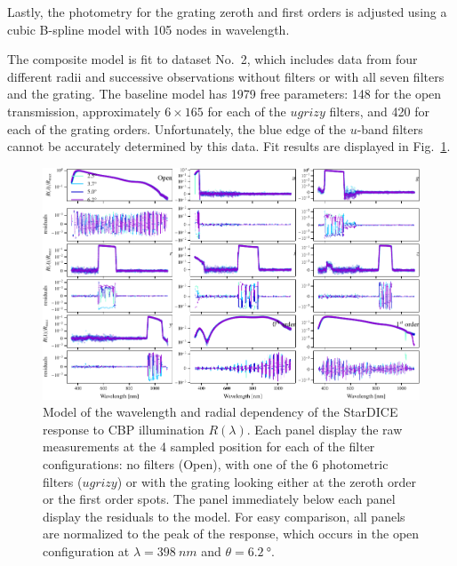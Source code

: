Lastly, the photometry for the grating zeroth and first orders is
adjusted using a cubic B-spline model with \num{105} nodes in
wavelength.

The composite model is fit to dataset No.~2, which includes data
from four different radii and successive observations without filters
or with all seven filters and the grating. The baseline model has
\num{1979} free parameters: \num{148} for the open transmission,
approximately $6\times165$ for each of the $ugrizy$ filters, and
\num{420} for each of the grating orders. Unfortunately, the blue edge
of the $u$-band filters cannot be accurately determined by this
data. Fit results are displayed in
Fig.~\ref{fig:lambdathetafitresults}.

\begin{figure}
  \centering
  \includegraphics[width=1\linewidth]{./fig/lambdathetafitresults.pdf}
  \caption{Model of the wavelength and radial dependency of the
    StarDICE response to CBP illumination $R(\lambda)$. Each panel
    display the raw measurements at the 4 sampled position for each of
    the filter configurations: no filters (Open), with one of the 6
    photometric filters ($ugrizy$) or with the grating looking either
    at the zeroth order or the first order spots. The panel
    immediately below each panel display the residuals to the
    model. For easy comparison, all panels are normalized to the peak
    of the response, which occurs in the open configuration at
    $\lambda = \SI{398}{nm}$ and $\theta = \SI{6.2}{\degree}$.  }
  \label{fig:lambdathetafitresults}
\end{figure}


